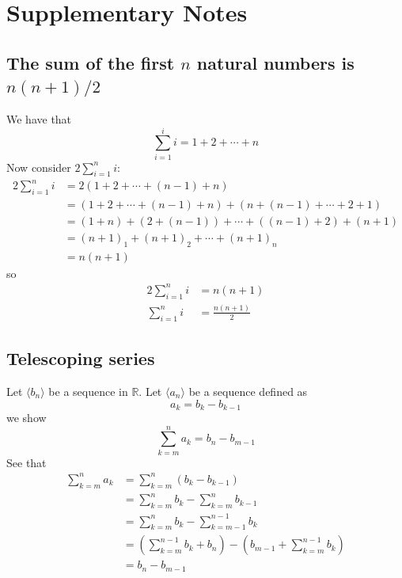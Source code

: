 \documentclass{report}
\begin{document}
\subsection{}





\newpage

\chapter{Supplementary Notes}

\section{The sum of the first $n$ natural numbers is $n(n+1)/2$}
\label{supnotes:1}
We have that
\begin{equation*}
\sum^i_{i=1}i=1+2+\cdots+n
\end{equation*}
Now consider $2\sum^n_{i=1}i$:
\begin{align*}
2\sum^n_{i=1}i&=2(1+2+\cdots+(n-1)+n)\\
&=(1+2+\cdots+(n-1)+n)+(n+(n-1)+\cdots+2+1)\\
&=(1+n)+(2+(n-1))+\cdots+((n-1)+2)+(n+1)\\
&=(n+1)_1+(n+1)_2+\cdots+(n+1)_n\\
&=n(n+1)
\end{align*}
so
\begin{align*}
2\sum^n_{i=1}i&=n(n+1)\\
\sum^n_{i=1}i&=\frac{n(n+1)}{2}
\end{align*}
\newpage

\section{Telescoping series}
\label{supnotes:2}
Let $\langle b_n\rangle$ be a sequence in $\mathbb{R}$. Let $\langle a_n\rangle$ be a sequence defined as
\begin{equation*}
a_k=b_k-b_{k-1}
\end{equation*}
we show
\begin{equation*}
\boxed{\sum^n_{k=m}a_k=b_n-b_{m-1}}
\end{equation*}
See that
\begin{align*}
\sum^n_{k=m}a_k&=\sum^n_{k=m}(b_k-b_{k-1})\\
&=\sum^n_{k=m}b_k-\sum^n_{k=m}b_{k-1}\\
&=\sum^n_{k=m}b_k-\sum^{n-1}_{k=m-1}b_k\\
&=\left(\sum^{n-1}_{k=m}b_k+b_n\right)-\left(b_{m-1}+\sum^{n-1}_{k=m}b_k\right)\\
&=b_n-b_{m-1}
\end{align*}
\newpage
\end{document}
